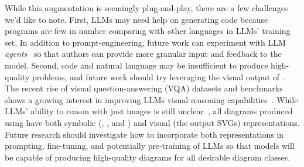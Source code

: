 While this augmentation is seemingly plug-and-play, there are a few challenges we'd like to note. First, LLMs may need help on generating \Substance code because \Substance programs are few in number comparing with other languages in LLMs' training set. In addition to prompt-engineering, future work can experiment with LLM \textit{agents}~\cite{wu_agentkit_2024} so that authors can provide more granular input and feedback to the model. Second, code and natural language may be insufficient to produce high-quality problems, and future work should try leveraging the visual output of \Edgeworth. The recent rise of visual question-answering (VQA) datasets and benchmarks shows a growing interest in improving LLMs visual reasoning capabilities~\cite{lu_mathvista_2024,belouadi_automatikz_2024,fatemi_talk_2023,masry_chartqa_2022}.  While LLMs' ability to reason with just images is still unclear~\cite{rahmanzadehgervi_vision_2024}, all diagrams produced using \Edgeworth have both symbolic (\ie \Substance, \Style, and \Domain) and visual (\ie the output SVGs) representations. Future research should investigate how to incorporate both representations in prompting, fine-tuning, and potentially pre-training of LLMs so that models will be capable of producing high-quality diagrams for all desirable diagram classes.


